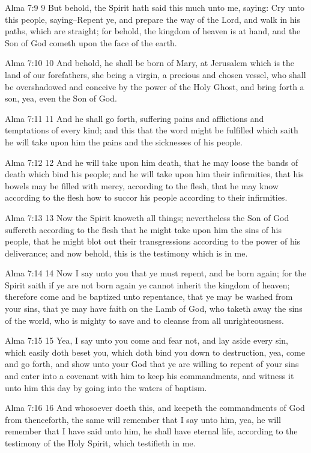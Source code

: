 Alma 7:9
 9 But behold, the Spirit hath said this much unto me, saying:
Cry unto this people, saying--Repent ye, and prepare the way of
the Lord, and walk in his paths, which are straight; for behold,
the kingdom of heaven is at hand, and the Son of God cometh upon
the face of the earth.

Alma 7:10
 10 And behold, he shall be born of Mary, at Jerusalem which is
the land of our forefathers, she being a virgin, a precious and
chosen vessel, who shall be overshadowed and conceive by the
power of the Holy Ghost, and bring forth a son, yea, even the Son
of God.

Alma 7:11
 11 And he shall go forth, suffering pains and afflictions and
temptations of every kind; and this that the word might be
fulfilled which saith he will take upon him the pains and the
sicknesses of his people.

Alma 7:12
 12 And he will take upon him death, that he may loose the bands
of death which bind his people; and he will take upon him their
infirmities, that his bowels may be filled with mercy, according
to the flesh, that he may know according to the flesh how to
succor his people according to their infirmities.

Alma 7:13
 13 Now the Spirit knoweth all things; nevertheless the Son of
God suffereth according to the flesh that he might take upon him
the sins of his people, that he might blot out their
transgressions according to the power of his deliverance; and now
behold, this is the testimony which is in me.

Alma 7:14
 14 Now I say unto you that ye must repent, and be born again;
for the Spirit saith if ye are not born again ye cannot inherit
the kingdom of heaven; therefore come and be baptized unto
repentance, that ye may be washed from your sins, that ye may
have faith on the Lamb of God, who taketh away the sins of the
world, who is mighty to save and to cleanse from all
unrighteousness.

Alma 7:15
 15 Yea, I say unto you come and fear not, and lay aside every
sin, which easily doth beset you, which doth bind you down to
destruction, yea, come and go forth, and show unto your God that
ye are willing to repent of your sins and enter into a covenant
with him to keep his commandments, and witness it unto him this
day by going into the waters of baptism.

Alma 7:16
 16 And whosoever doeth this, and keepeth the commandments of God
from thenceforth, the same will remember that I say unto him,
yea, he will remember that I have said unto him, he shall have
eternal life, according to the testimony of the Holy Spirit,
which testifieth in me.

